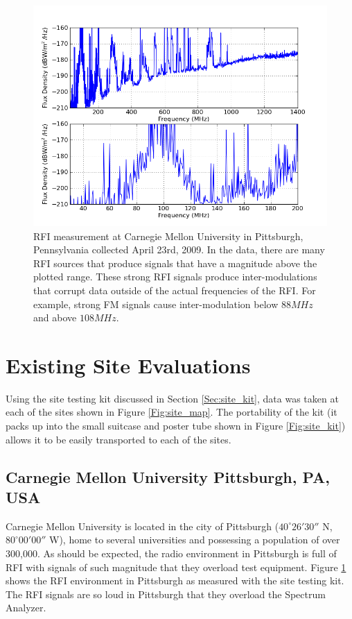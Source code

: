 \begin{figure}[tb]
\begin{center}
\includegraphics[width=0.9\linewidth]{RFI_testing/figures/Pittsburgh_cal.png}
\caption{RFI measurement at Carnegie Mellon University in Pittsburgh, Pennsylvania collected April 23rd, 2009. In the data, there are many RFI sources that produce signals that have a magnitude above the plotted range. These strong RFI signals produce inter-modulations that corrupt data outside of the actual frequencies of the RFI. For example, strong FM signals cause inter-modulation below  $88 MHz$ and above $108 MHz$. }
\label{Fig:pghcal}
\end{center}
\end{figure}



\section{Existing Site Evaluations}

Using the site testing kit discussed in Section \ref{Sec:site_kit}, data was taken at each of the sites shown in Figure \ref{Fig:site_map}. The portability of the kit (it packs up into the small suitcase and poster tube shown in Figure \ref{Fig:site_kit}) allows it to be easily transported to each of the sites. 


\subsection{Carnegie Mellon University Pittsburgh, PA, USA}

Carnegie Mellon University is located in the city of Pittsburgh ($40^\circ 26'30''$ N, $80^\circ 00' 00''$ W), home to several universities and possessing a population of over 300,000. As should be expected, the radio environment in Pittsburgh is full of RFI with signals of such magnitude that they overload test equipment. Figure \ref{Fig:pghcal} shows the RFI environment in Pittsburgh as measured with the site testing kit. The RFI signals are so loud in Pittsburgh that they overload the Spectrum Analyzer. 

